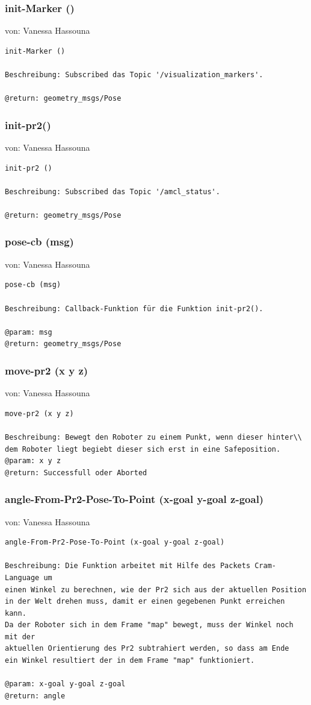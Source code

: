 \documentclass{suturo}
\makeatletter
\newcommand{\chapterauthor}[1]{%
  {\parindent0pt\vspace*{-27pt}%
  \linespread{0}\small\begin{flushright}von: #1\end{flushright}%
  \par\nobreak\vspace*{0pt}}
  \@afterheading%
}
\makeatother
\begin{document}
\subsubsection{init-Marker ()}
\chapterauthor{Vanessa Hassouna}
\begin{verbatim}
init-Marker ()

Beschreibung: Subscribed das Topic '/visualization_markers'.

@return: geometry_msgs/Pose
\end{verbatim}

\subsubsection{init-pr2()}
\chapterauthor{Vanessa Hassouna}
\begin{verbatim}
init-pr2 ()

Beschreibung: Subscribed das Topic '/amcl_status'.

@return: geometry_msgs/Pose
\end{verbatim}

\subsubsection{pose-cb (msg)}
\chapterauthor{Vanessa Hassouna}
\begin{verbatim}
pose-cb (msg)

Beschreibung: Callback-Funktion für die Funktion init-pr2().

@param: msg
@return: geometry_msgs/Pose
\end{verbatim}

\subsubsection{move-pr2 (x y z)}
\chapterauthor{Vanessa Hassouna}
\begin{verbatim}
move-pr2 (x y z)

Beschreibung: Bewegt den Roboter zu einem Punkt, wenn dieser hinter\\
dem Roboter liegt begiebt dieser sich erst in eine Safeposition.
@param: x y z 
@return: Successfull oder Aborted
\end{verbatim}

\subsubsection{angle-From-Pr2-Pose-To-Point (x-goal y-goal z-goal)}
\chapterauthor{Vanessa Hassouna}
\begin{verbatim}
angle-From-Pr2-Pose-To-Point (x-goal y-goal z-goal)

Beschreibung: Die Funktion arbeitet mit Hilfe des Packets Cram-Language um 
einen Winkel zu berechnen, wie der Pr2 sich aus der aktuellen Position 
in der Welt drehen muss, damit er einen gegebenen Punkt erreichen kann.
Da der Roboter sich in dem Frame "map" bewegt, muss der Winkel noch mit der 
aktuellen Orientierung des Pr2 subtrahiert werden, so dass am Ende
ein Winkel resultiert der in dem Frame "map" funktioniert.

@param: x-goal y-goal z-goal 
@return: angle 
\end{verbatim}
\end{document}
